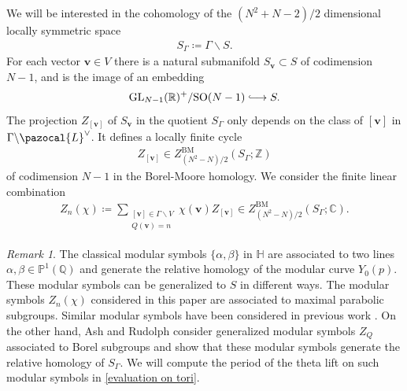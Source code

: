 \documentclass[a4paper,11pt]{amsart} %
\newcommand{\8}{\infty}
\newcommand{\Z}{\mathbb{Z}}
\newcommand{\vbf}{\mathbf{v}}
\newcommand{\SO}{\mathrm{SO}}
\newcommand{\SL}{\mathrm{SL}}
\newcommand{\BM}{\mathrm{BM}}
\newcommand{\GL}{\mathrm{GL}}
\newcommand{\HH}{\mathbb{H}}
\newcommand{\R}{\mathbb{R}}
\newcommand{\Q}{\mathbb{Q}}
\newcommand{\C}{\mathbb{C}}
\newcommand{\PP}{\mathbb{P}}
\newcommand{\Lcal}{\pazocal{L}}
\newcommand{\hooklongrightarrow}{\lhook\joinrel\longrightarrow}
\theoremstyle{mytheoremstyle}
\theoremstyle{remark}
\newtheorem{rmk}{Remark}[section]
\numberwithin{equation}{section}
\begin{document}
We will be interested in the cohomology of the $(N^2+N-2)/2$ dimensional locally symmetric space  \begin{align}
S_{\Gamma} \coloneqq \Gamma \backslash S.
\end{align}
For each vector $\vbf \in V$ there is a natural submanifold $S_\vbf \subset S$ of codimension $N-1$, and is the image of an embedding
\begin{align}
\GL_{N-1}(\R)^+/\SO(N-1) \hooklongrightarrow S.
\end{align}
The projection $Z_{[\vbf]}$ of $S_\vbf$ in the quotient $S_{\Gamma}$ only depends on the class  of $[\vbf]$ in $\Gamma \backslash  \Lcal^\vee$. It defines a locally finite cycle
\begin{align}
Z_{[\vbf]} \in Z^{\BM}_{(N^2-N)/2}(S_\Gamma;\Z)
\end{align}
of codimension $N-1$ in the Borel-Moore homology. We consider the finite linear combination
\begin{align}
Z_n(\chi) \coloneqq \sum_{\substack{ [\vbf ] \in \Gamma \backslash  V \\ Q(\vbf)=n}} \chi(\vbf)Z_{[\vbf]} \in Z^{\BM}_{(N^2-N)/2}(S_\Gamma;\C).
\end{align}
\begin{rmk} The classical modular symbols $\{\alpha,\beta\}$ in $\HH$ are associated to two lines $\alpha, \beta \in \PP^1(\Q)$ and generate the relative homology of the modular curve $Y_0(p)$. %
These modular symbols can be generalized to $S$ in different ways. The modular symbols $Z_n(\chi)$ considered in this paper are associated to maximal parabolic subgroups. Similar modular symbols have been considered in previous work \cite{modsymb, schmidt}. On the other hand, Ash and Rudolph \cite{ashrud} consider generalized modular symbols $Z_Q$ associated to Borel subgroups and show that these modular symbols generate the relative homology of $S_\Gamma$.  We will compute the period of the theta lift on such modular symbols in \ref{evaluation on tori}.
\end{rmk}
\end{document}
